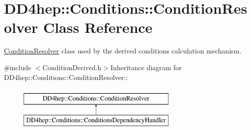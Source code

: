\hypertarget{class_d_d4hep_1_1_conditions_1_1_condition_resolver}{
\section{DD4hep::Conditions::ConditionResolver Class Reference}
\label{class_d_d4hep_1_1_conditions_1_1_condition_resolver}
}


\hyperlink{class_d_d4hep_1_1_conditions_1_1_condition_resolver}{ConditionResolver} class used by the derived conditions calculation mechanism.  


{\ttfamily \#include $<$ConditionDerived.h$>$}Inheritance diagram for DD4hep::Conditions::ConditionResolver::\begin{figure}[H]
\begin{center}
\leavevmode
\includegraphics[height=2cm]{class_d_d4hep_1_1_conditions_1_1_condition_resolver}
\end{center}
\end{figure}
